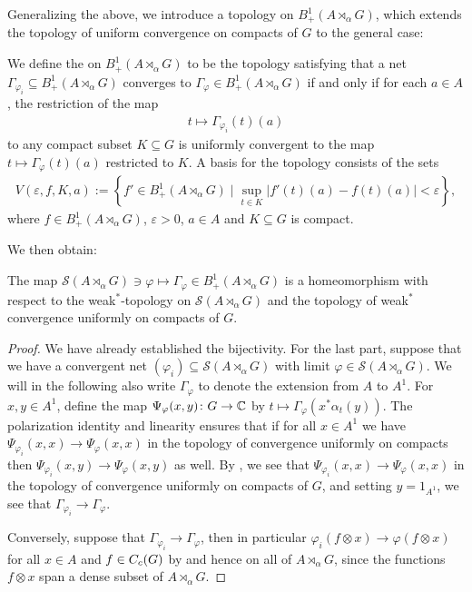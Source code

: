Generalizing the above, we introduce a topology on $B_+^1(A \rtimes_\alpha G)$, which extends the topology of uniform convergence on compacts of $G$ to the general case:
\begin{definition}
We define the  on $B_+^1(A \rtimes_\alpha G)$ to be the topology satisfying that a net $\Gamma_{\varphi_i} \subseteq B_+^1(A \rtimes_\alpha G)$ converges to $\Gamma_{\varphi} \in B_+^1(A \rtimes_\alpha G)$ if and only if for each $a \in A$, the restriction of the map
\begin{align*}
	t \mapsto \Gamma_{\varphi_i}(t)(a)
\end{align*}
to any compact subset $K \subseteq G$ is uniformly convergent to the map $t \mapsto \Gamma_\varphi(t)(a)$ restricted to $K$. A basis for the topology consists of the sets
\begin{align*}
	V(\varepsilon, f, K, a) :=\left\{ f' \in B_+^1(A \rtimes_\alpha G) \mid \sup_{t \in K}| f'(t)(a) - f(t)(a) | < \varepsilon \right\},
\end{align*}
where $f \in B_{+}^1(A \rtimes_\alpha G)$, $\varepsilon > 0$, $a \in A$ and $K \subseteq G$ is compact.
\end{definition}

We then obtain:
\begin{proposition}
The map $\mathcal{S}(A \rtimes_\alpha G) \ni \varphi \mapsto \Gamma_\varphi \in B_+^1(A \rtimes_\alpha G)$ is a homeomorphism with respect to the weak$^*$-topology on $\mathcal{S}(A \rtimes_\alpha G)$ and the topology of weak$^*$ convergence uniformly on compacts of $G$.	
\end{proposition}
\begin{proof}
We have already established the bijectivity. For the last part, suppose that we have a convergent net $(\varphi_i) \subseteq \mathcal{S}(A \rtimes _\alpha  G)$	with limit $\varphi \in \mathcal{S}(A \rtimes_\alpha G)$. We will in the following also write $\Gamma_\varphi$ to denote the extension from $A$ to $A^1$. For $x,y \in A^1$, define the map $\Psi_{\varphi}(x,y) \colon G \to \mathbb{C}$ by $t \mapsto \Gamma_\varphi(x^* \alpha_t(y))$. The polarization identity and linearity ensures that if for all $x \in A^1$ we have $\Psi_{\varphi_i}(x,x) \to \Psi_{\varphi}(x,x)$ in the topology of convergence uniformly on compacts then $\Psi_{\varphi_i}(x,y) \to \Psi_{\varphi}(x,y)$ as well. By , we see that $\Psi_{\varphi_i}(x,x) \to \Psi_{\varphi}(x,x)$ in the topology of convergence uniformly on compacts of $G$, and setting $y = 1_{A^1}$, we see that $\Gamma_{\varphi_i} \to \Gamma_\varphi$.

Conversely, suppose that $\Gamma_{\varphi_i} \to \Gamma_{\varphi}$, then in particular $\varphi_{i}(f \otimes x) \to \varphi(f \otimes x)$ for all $x \in A$ and $f \in C_c(G)$ by  and hence on all of $A \rtimes_\alpha G$, since the functions $f \otimes x$ span a dense subset of $A \rtimes_\alpha G$.
\end{proof}

